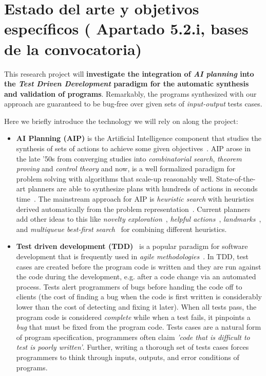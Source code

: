 \documentclass[10pt,a4paper]{paper}
\begin{document}
\section{Estado del arte y objetivos específicos ( Apartado 5.2.i, bases de la convocatoria)}

This research project will {\bf investigate the integration of {\em AI planning} into the {\em Test Driven Development} paradigm for the automatic synthesis and validation of programs}. Remarkably, the programs synthesized with our approach are guaranteed to be bug-free over given sets of {\em input-output} tests cases.

Here we briefly introduce the technology we will rely on along the project:
\begin{itemize}
\item {\bf AI Planning (AIP)} is the Artificial Intelligence component that studies the synthesis of sets of actions to achieve some given objectives~\cite{ghallab2004automated}. AIP arose in the late ’50s from converging studies into {\em combinatorial search}, {\em theorem proving} and {\em control theory} and now, is a well formalized paradigm for problem solving with algorithms that scale-up reasonably well. State-of-the-art planners are able to synthesize plans with hundreds of actions in seconds time~\cite{geffner2013concise}.  The mainstream approach for AIP is {\em heuristic search} with heuristics derived automatically from the problem representation~\cite{mcdermott1996heuristic,bonet2001planning}.  Current planners add other ideas to this like {\it novelty exploration}~\cite{geffner:psimulators:IJCAI17}, {\it helpful actions}~\cite{hoffmann2001ff}, {\it landmarks}~\cite{helmert2006fast}, and {\it multiqueue best-first search}~\cite{richter2010lama} for combining different heuristics.
  
\item {\bf Test driven development (TDD)}~\cite{beck:TDD:2003} is a popular paradigm for software development that is frequently used in {\it agile methodologies}~\cite{cohen2003agile}. In TDD, test cases are created before the program code is written and they are run against the code during the development, e.g. after a code change via an automated process. Tests alert programmers of bugs before handing the code off to clients (the cost of finding a bug when the code is first written is considerably lower than the cost of detecting and fixing it later). When all tests pass, the program code is considered {\em complete} while when a test fails, it pinpoints a {\em bug} that must be fixed from the program code. Tests cases are a natural form of program specification, programmers often claim {\em 'code that is difficult to test is poorly written'}. Further, writing a thorough set of tests cases forces programmers to think through inputs, outputs, and error conditions of programs. 
\end{itemize}
\end{document}
